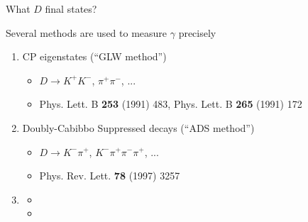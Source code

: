 \documentclass[dvipsnames]{beamer}
\begin{document}
\begin{frame}{What $D$ final states?}
  \begin{center}
    \Large Several methods are used to measure $\gamma$ precisely
  \end{center}
  \vspace{0.2cm}
  \begin{enumerate}
    \setlength\itemsep{1.0em}
    \item{CP eigenstates (``GLW method'')}
    \begin{itemize}
      \item{$D\to K^+K^-$, $\pi^+\pi^-$, ...}
      \item{Phys. Lett. B \textbf{253} (1991) 483, Phys. Lett. B \textbf{265} (1991) 172}
    \end{itemize}
    \item{Doubly-Cabibbo Suppressed decays (``ADS method'')}
    \begin{itemize}
      \item{$D\to K^-\pi^+$, $K^-\pi^+\pi^-\pi^+$, ...}
      \item{Phys. Rev. Lett. \textbf{78} (1997) 3257}
    \end{itemize}
    \item{\phantom{Self-conjugate multi-body final states (``BPGGSZ method'')}}
    \begin{itemize}
      \item[]{\phantom{$D\to K_S^0\pi^+\pi^-$, $K_S^0K^+K^-$, ...}}
      \item[]{}
    \end{itemize}
  \end{enumerate}
\end{frame}
\end{document}
